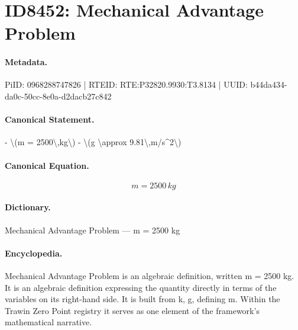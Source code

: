 \section*{ID8452: Mechanical Advantage Problem}
\paragraph{Metadata.}
PiID: 0968288747826 | RTEID: RTE:P32820.9930:T3.8134 | UUID: b44da434-da0c-50cc-8e0a-d2dacb27c842

\paragraph{Canonical Statement.}
- \textbackslash{}(m = 2500\textbackslash{},kg\textbackslash{}) - \textbackslash{}(g \textbackslash{}approx 9.81\textbackslash{},m/s\textasciicircum{}2\textbackslash{})

\paragraph{Canonical Equation.}
\[
m = 2500\,kg
\]

\paragraph{Dictionary.}
Mechanical Advantage Problem — m = 2500 kg

\paragraph{Encyclopedia.}
Mechanical Advantage Problem is an algebraic definition, written m = 2500 kg. It is an algebraic definition expressing the quantity directly in terms of the variables on its right-hand side. It is built from k, g, defining m. Within the Trawin Zero Point registry it serves as one element of the framework's mathematical narrative.

